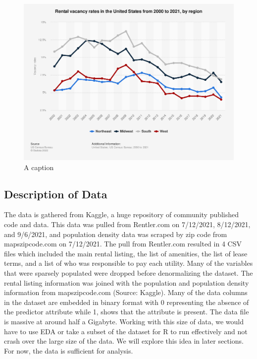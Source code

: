 \documentclass[
]{article}
\begin{document}
\begin{figure}

{\centering \includegraphics[width=1\linewidth]{image/rental-vacancy-rates} 

}

\caption{A caption}\label{fig:pressure}
\end{figure}

\hypertarget{description-of-data}{%
\subsection{Description of Data}\label{description-of-data}}

The data is gathered from Kaggle, a huge repository of community
published code and data. This data was pulled from Rentler.com on
7/12/2021, 8/12/2021, and 9/6/2021, and population density data was
scraped by zip code from mapszipcode.com on 7/12/2021. The pull from
Rentler.com resulted in 4 CSV files which included the main rental
listing, the list of amenities, the list of lease terms, and a list of
who was responsible to pay each utility. Many of the variables that were
sparsely populated were dropped before denormalizing the dataset. The
rental listing information was joined with the population and population
density information from mapszipcode.com (Source: Kaggle). Many of the
data columns in the dataset are embedded in binary format with 0
representing the absence of the predictor attribute while 1, shows that
the attribute is present. The data file is massive at around half a
Gigabyte. Working with this size of data, we would have to use EDA or
take a subset of the dataset for R to run effectively and not crash over
the large size of the data. We will explore this idea in later sections.
For now, the data is sufficient for analysis.
\end{document}
